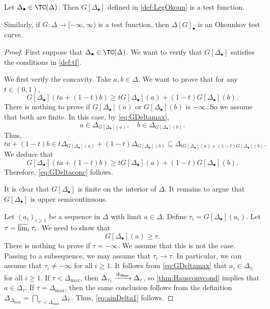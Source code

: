 \begin{lemma}\label{lma:convbodyLegendre}
    Let $\Delta_{\bullet}\in \TC(\Delta)$. Then $G[\Delta_{\bullet}]$ defined in \cref{def:LegOkoun} is a test function.

    Similarly, if $G\colon \Delta\rightarrow [-\infty,\infty)$ is a test function, then $\Delta[G]_{\bullet}$ is an Okounkov test curve.
\end{lemma}
\begin{proof}
    First suppose that $\Delta_{\bullet}\in \TC(\Delta)$. We want to verify that $G[\Delta_{\bullet}]$ satisfies the conditions in \cref{def:tf}.

    We first verify the concavity.
    Take $a,b\in \Delta$. We want to prove that for any $t\in (0,1)$,
	\begin{equation}\label{eq:GDeltaconc}
		G[\Delta_{\bullet}](ta+(1-t)b)\geq tG[\Delta_{\bullet}](a)+(1-t)G[\Delta_{\bullet}](b).
	\end{equation}
	There is nothing to prove if $G[\Delta_{\bullet}](a)$ or $G[\Delta_{\bullet}](b)$ is $-\infty$. So we assume that both are finite. In this case, by \eqref{eq:GDeltamax},
    \[
    a\in \Delta_{G[\Delta_{\bullet}](a)},\quad b\in \Delta_{G[\Delta_{\bullet}](b)}.
    \]
    Thus,
	\[
		ta+(1-t)b\in t  \Delta_{G[\Delta_{\bullet}](a)}+(1-t)\Delta_{G[\Delta_{\bullet}](b)}\subseteq \Delta_{tG[\Delta_{\bullet}](a)+(1-t)G[\Delta_{\bullet}](b)}.
	\]
	We deduce that
	\[
		G[\Delta_{\bullet}](ta+(1-t)b)\geq tG[\Delta_{\bullet}](a)+(1-t)G[\Delta_{\bullet}](b).
	\]
	Therefore, \eqref{eq:GDeltaconc} follows.

 It is clear that $G[\Delta_{\bullet}]$ is finite on the interior of $\Delta$. It remains to argue that $G[\Delta_{\bullet}]$ is upper semicontinuous.

 Let $(a_i)_{i\geq 1}$ be a sequence in $\Delta$ with limit $a\in \Delta$. Define $\tau_i=G[\Delta_{\bullet}](a_i)$. Let $\tau=\varlimsup_i \tau_i$.
	We need to show that
	\begin{equation}\label{eq:ainDelta1}
		G[\Delta_{\bullet}](a)\geq \tau.
	\end{equation}
    There is nothing to prove if $\tau=-\infty$. We assume that this is not the case. Passing to a subsequence, we may assume that $\tau_i\to \tau$. In particular, we can assume that $\tau_i\neq -\infty$ for all $i\geq 1$.
    It follows from \eqref{eq:GDeltamax} that $a_i\in\Delta_{\tau_i}$ for all $i\geq 1$.
    If $\tau<\Delta_{\max}$, then $\Delta_{\tau_i}\xrightarrow{d_{\Haus}}\Delta_{\tau}$, so \cref{thm:Hausconvcond} implies that $a\in \Delta_{\tau}$. If $\tau=\Delta_{\max}$, then the same conclusion follows from the definition $\Delta_{\Delta_{\max}}=\bigcap_{\tau'<\Delta_{\max}}\Delta_{\tau'}$.
    Thus, \eqref{eq:ainDelta1} follows.


\end{proof}
